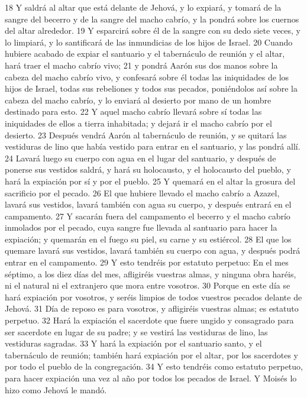 18 Y saldrá al altar que está delante de Jehová, y lo expiará, y tomará de la sangre del becerro y de la sangre del macho cabrío, y la pondrá sobre los cuernos del altar alrededor.
19 Y esparcirá sobre él de la sangre con su dedo siete veces, y lo limpiará, y lo santificará de las inmundicias de los hijos de Israel.
20 Cuando hubiere acabado de expiar el santuario y el tabernáculo de reunión y el altar, hará traer el macho cabrío vivo;
21 y pondrá Aarón sus dos manos sobre la cabeza del macho cabrío vivo, y confesará sobre él todas las iniquidades de los hijos de Israel, todas sus rebeliones y todos sus pecados, poniéndolos así sobre la cabeza del macho cabrío, y lo enviará al desierto por mano de un hombre destinado para esto.
22 Y aquel macho cabrío llevará sobre sí todas las iniquidades de ellos a tierra inhabitada; y dejará ir el macho cabrío por el desierto.
23 Después vendrá Aarón al tabernáculo de reunión, y se quitará las vestiduras de lino que había vestido para entrar en el santuario, y las pondrá allí.
24 Lavará luego su cuerpo con agua en el lugar del santuario, y después de ponerse sus vestidos saldrá, y hará su holocausto, y el holocausto del pueblo, y hará la expiación por sí y por el pueblo.
25 Y quemará en el altar la grosura del sacrificio por el pecado.
26 El que hubiere llevado el macho cabrío a Azazel, lavará sus vestidos, lavará también con agua su cuerpo, y después entrará en el campamento.
27 Y sacarán fuera del campamento el becerro y el macho cabrío inmolados por el pecado, cuya sangre fue llevada al santuario para hacer la expiación; y quemarán en el fuego su piel, su carne y su estiércol.
28 El que los quemare lavará sus vestidos, lavará también su cuerpo con agua, y después podrá entrar en el campamento.
29 Y esto tendréis por estatuto perpetuo: En el mes séptimo, a los diez días del mes, afligiréis vuestras almas, y ninguna obra haréis, ni el natural ni el extranjero que mora entre vosotros.
30 Porque en este día se hará expiación por vosotros, y seréis limpios de todos vuestros pecados delante de Jehová.
31 Día de reposo es para vosotros, y afligiréis vuestras almas; es estatuto perpetuo.
32 Hará la expiación el sacerdote que fuere ungido y consagrado para ser sacerdote en lugar de su padre; y se vestirá las vestiduras de lino, las vestiduras sagradas.
33 Y hará la expiación por el santuario santo, y el tabernáculo de reunión; también hará expiación por el altar, por los sacerdotes y por todo el pueblo de la congregación.
34 Y esto tendréis como estatuto perpetuo, para hacer expiación una vez al año por todos los pecados de Israel. Y Moisés lo hizo como Jehová le mandó.

